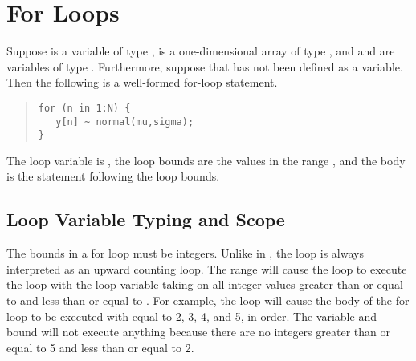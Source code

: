 



\section{For Loops}

Suppose
 is a variable of type ,  is a
one-dimensional array of type , and  and
 are variables of type .  Furthermore, suppose
that  has not been defined as a variable. Then the following
is a well-formed for-loop statement.
%
\begin{quote}
\begin{Verbatim}[fontsize=\small]
for (n in 1:N) {
   y[n] ~ normal(mu,sigma);
}
\end{Verbatim}
\end{quote}
%
The loop variable is , the loop bounds are the values in the
range , and the body is the statement following the
loop bounds.  

\subsection{Loop Variable Typing and Scope}

The bounds in a for loop must be integers.  Unlike in \R, the loop is
always interpreted as an upward counting loop.  The range 
will cause the loop to execute the loop with the loop variable taking
on all integer values greater than or equal to  and less than
or equal to .  For example, the loop 
will cause the body of the for loop to be executed with  equal
to 2, 3, 4, and 5, in order.  The variable and bound  will not execute anything because there are no integers
greater than or equal to 5 and less than or equal to 2.

